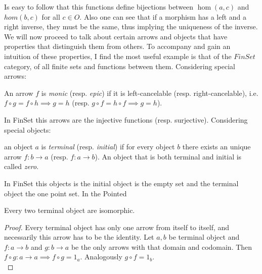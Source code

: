 Is easy to follow that this functions define bijections between $\hom(a,c)$ and $hom(b,c)$ for all $c\in O$. Also one can see that if a morphism has a left and a right inverse, they must be the same, thus implying the uniqueness of the inverse.\\


We will now proceed to talk about certain arrows and objects that have properties that distinguish them from others. To accompany and gain an intuition of these properties, I find the most useful example is that of the $FinSet$ category, of all finite sets and functions between them.  Considering special arrows:\\

\begin{definition} An arrow $f$ is  \emph{monic} (resp. \emph{epic}) if it is left-cancelable (resp. right-cancelable), i.e.  $f\circ g = f \circ h \implies g = h$ (resp. $g\circ f = h \circ f \implies g = h$).
\end{definition}


 
In FinSet this arrows are the injective functions (resp. surjective). Considering special objects:

\begin{definition}
  an object $a$ is \emph{terminal} (resp. \emph{initial}) if for every object $b$ there exists an unique arrow $f:b\to a$ (resp. $f:a\to b$).  An object that is both terminal and initial is called \emph{zero}.
\end{definition}

  In FinSet this objects is the initial object is the  empty set and the terminal object the one point set. In the Pointed 

\begin{proposition}\label{terminal-proposition}
  Every two terminal object are isomorphic.
\end{proposition}
\begin{proof}
 Every terminal object has only one arrow from itself to itself, and necessarily this arrow has to be the identity. Let $a, b$ be terminal object and $f:a\to b$ and $g:b\to a$ be the only arrows with that domain and codomain. Then $f\circ g : a \to a \implies f \circ g = 1_a$. Analogously $g \circ f = 1_b$.\\
\end{proof}

